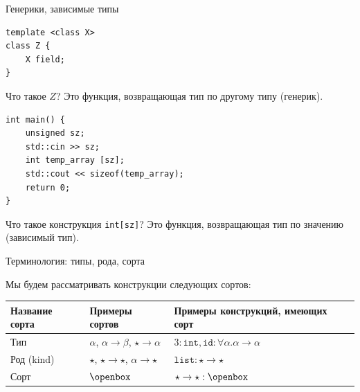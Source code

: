 \documentclass[aspectratio=169]{beamer}
\begin{document}

\begin{frame}[fragile]{Генерики, зависимые типы}


\begin{verbatim}
template <class X>
class Z {
    X field;
}
\end{verbatim}

Что такое $Z$? Это функция, возвращающая тип по другому типу (генерик). %

\begin{verbatim}
int main() {
    unsigned sz;
    std::cin >> sz;
    int temp_array [sz];
    std::cout << sizeof(temp_array);
    return 0;
}
\end{verbatim}

Что такое конструкция \verb!int[sz]!? Это функция, возвращающая тип по значению (зависимый тип).

\end{frame}

\begin{frame}{Терминология: типы, рода, сорта}

Мы будем рассматривать конструкции следующих сортов:
\vspace{0.3cm}\begin{tabular}{lll}
Название сорта & Примеры сортов & Примеры конструкций, имеющих сорт\\\hline
Тип & $\alpha$, $\alpha\rightarrow\beta$, $\star\rightarrow\alpha$ & $3:\texttt{int}, \texttt{id}: \forall\alpha.\alpha\rightarrow\alpha$\\
Род (kind) & $\star$, $\star\rightarrow\star$, $\alpha\rightarrow\star$ & $\texttt{list}: \star\rightarrow\star$\\
Сорт & $\openbox$ & $\star\rightarrow\star : \openbox$
\end{tabular}

\end{frame}
\end{document}
